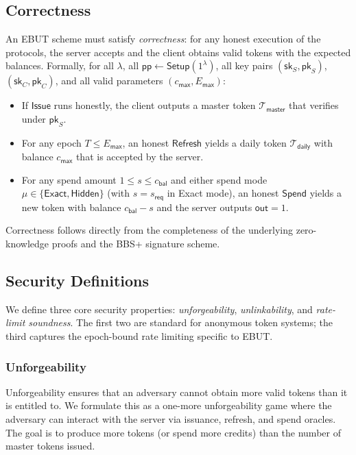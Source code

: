 \documentclass[11pt]{article}
\theoremstyle{definitionstyle}
\theoremstyle{plain}
\begin{document}
\subsection{Correctness}
An EBUT scheme must satisfy \emph{correctness}: for any honest execution of the protocols, the server accepts and the client obtains valid tokens with the expected balances. Formally, for all $\lambda$, all $\mathsf{pp} \leftarrow \mathsf{Setup}(1^\lambda)$, all key pairs $(\mathsf{sk}_S, \mathsf{pk}_S)$, $(\mathsf{sk}_C, \mathsf{pk}_C)$, and all valid parameters $(c_{\mathsf{max}}, E_{\mathsf{max}})$:
\begin{itemize}
\item If $\mathsf{Issue}$ runs honestly, the client outputs a master token $\mathcal{T}_{\mathsf{master}}$ that verifies under $\mathsf{pk}_S$.
\item For any epoch $T \le E_{\mathsf{max}}$, an honest $\mathsf{Refresh}$ yields a daily token $\mathcal{T}_{\mathsf{daily}}$ with balance $c_{\mathsf{max}}$ that is accepted by the server.
\item For any spend amount $1 \le s \le c_{\mathsf{bal}}$ and either spend mode $\mu \in \{\mathsf{Exact},\mathsf{Hidden}\}$ (with $s = s_{\mathsf{req}}$ in Exact mode), an honest $\mathsf{Spend}$ yields a new token with balance $c_{\mathsf{bal}}-s$ and the server outputs $\mathsf{out}=1$.
\end{itemize}
Correctness follows directly from the completeness of the underlying zero-knowledge proofs and the BBS+ signature scheme.

\subsection{Security Definitions}
We define three core security properties: \emph{unforgeability}, \emph{unlinkability}, and \emph{rate-limit soundness}. The first two are standard for anonymous token systems; the third captures the epoch-bound rate limiting specific to EBUT.

\subsubsection{Unforgeability}
Unforgeability ensures that an adversary cannot obtain more valid tokens than it is entitled to. We formulate this as a one-more unforgeability game where the adversary can interact with the server via issuance, refresh, and spend oracles. The goal is to produce more tokens (or spend more credits) than the number of master tokens issued.
\end{document}

